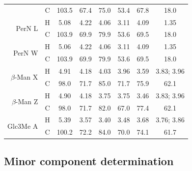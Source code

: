 \begin{table}[hp]
\begin{tabular}{@{}rccccccc@{}}
         & C & 103.5 & 67.4 & 75.0 & 53.4 & 67.8 & 18.0 \\
            \multirow{2}{*}{PerN L}        & H & 5.08  & 4.22 & 4.06 & 3.11 & 4.09 & 1.35 \\
         & C & 103.9 & 69.9 & 79.9 & 53.6 & 69.5 & 18.0 \\
            \multirow{2}{*}{PerN W}        & H & 5.06  & 4.22 & 4.06 & 3.11 & 4.09 & 1.35 \\
         & C & 103.9 & 69.9 & 79.9 & 53.6 & 69.5 & 18.0 \\
            \multirow{2}{*}{$\beta$-Man X} & H & 4.91  & 4.18 & 4.03 & 3.96 & 3.59 & 3.83; 3.96 \\
         & C & 98.0  & 71.7 & 85.0 & 71.7 & 75.9 & 62.1 \\
            \multirow{2}{*}{$\beta$-Man Z} & H & 4.90  & 4.18 & 3.75 & 3.75 & 3.46 & 3.83; 3.96 \\
         & C & 98.0  & 71.7 & 82.0 & 67.0 & 77.4 & 62.1 \\
            \multirow{2}{*}{Glc3Me A}      & H & 5.39  & 3.57 & 3.40 & 3.48 & 3.68 & 3.76; 3.86 \\
         & C & 100.2 & 72.2 & 84.0 & 70.0 & 74.1 & 61.7 \\ \bottomrule
          \end{tabular}
        \end{table}
  
        \subsection{Minor component determination} %
        \label{sub:minor_component_determination}

